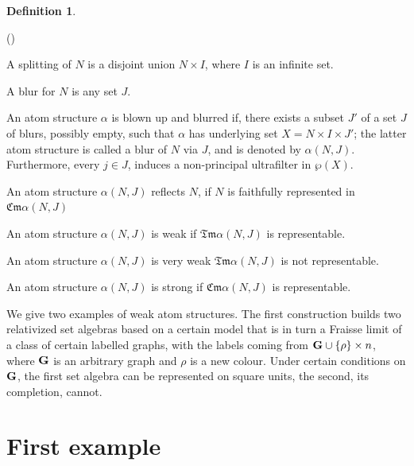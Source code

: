 \documentclass[12pt]{article}
\newcounter{item}[section]
\newcounter{kirshb}
\newenvironment{enumarab}{\setcounter{kirshb}{1}
\begin{list}{(\arabic{kirshb})}{\usecounter{kirshb}} }{\end{list}}
\theoremstyle{definition}
\newtheorem{example}[theorem]{Example}
\newtheorem{definition}[theorem]{Definition}
\def\G{{\sf G}}
\def\Cm{{\mathfrak{Cm}}}
\def\Tm{{\mathfrak{Tm}}}
\def\G{{\bf G}}
\begin{document}
\begin{definition}
\begin{enumarab}
 
\item A splitting of $N$ is a disjoint union  $N\times I$, where $I$ is an infinite set. 

\item  A blur for $N$ is any  set  $J$. 

\item An atom structure $\alpha$ is blown up and blurred if, there exists a subset $J'$ of a set $J$ of blurs, possibly empty,
such that  $\alpha$ has underlying set $X=N\times I \times J'$; the latter atom structure is called a blur of $N$ via $J$, 
and is denoted by $\alpha(N,J).$  Furthermore, every $j\in J$, induces a non-principal ultrafilter in $\wp(X)$.

\item An atom structure $\alpha(N, J)$ reflects $N$, if $N$ is faithfully represented in $\Cm\alpha(N,J)$

\item An atom structure $\alpha(N,J)$ is  weak if $\Tm\alpha(N,J)$ is representable.

\item An atom structure $\alpha(N, J)$ is very weak $\Tm\alpha(N,J)$ is not representable.

\item An atom structure $\alpha(N,J)$ is strong if  $\Cm\alpha(N,J)$ is representable.
\end{enumarab} 

\end{definition}


We give two examples of weak atom structures.
The first construction builds two relativized 
set algebras based on a certain model that is in turn a Fraisse limit of a class of certain
labelled graphs, with the labels coming from $\G\cup \{\rho\}\times n$, where $\G$ is an arbitrary graph and $\rho$ is a new colour. 
Under certain conditions on $\G$, the first set algebra can be represented on square units, the second, its completion, cannot.

\section{First example}

\end{document}
